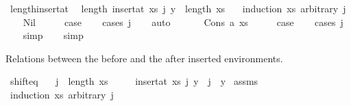 \begin{isabellebody}
\ length{\isacharunderscore}{\kern0pt}insert{\isacharunderscore}{\kern0pt}at{\isacharcolon}{\kern0pt}\isanewline
\ \ {\isachardoublequoteopen}length\ {\isacharparenleft}{\kern0pt}insert{\isacharunderscore}{\kern0pt}at\ xs\ j\ y{\isacharparenright}{\kern0pt}\ {\isacharequal}{\kern0pt}\ length\ xs\ {\isacharplus}{\kern0pt}\ {}{\isachardoublequoteclose}\isanewline
%
\isadelimproof
%
\endisadelimproof
%
\isatagproof
{}\isamarkupfalse%
\ {\isacharparenleft}{\kern0pt}induction\ xs\ arbitrary{\isacharcolon}{\kern0pt}\ j{\isacharparenright}{\kern0pt}\isanewline
\ \ \isamarkupfalse%
\ Nil\isanewline
\ \ \isamarkupfalse%
\ \isamarkupfalse%
\ {\isacharquery}{\kern0pt}case\isanewline
\ \ \isamarkupfalse%
\ {\isacharparenleft}{\kern0pt}cases\ j{\isacharparenright}{\kern0pt}\isanewline
\ \ \isamarkupfalse%
\ auto\isanewline
\ \ \isamarkupfalse%
\isanewline
{}\isamarkupfalse%
\isanewline
\ \ \isamarkupfalse%
\ {\isacharparenleft}{\kern0pt}Cons\ a\ xs{\isacharparenright}{\kern0pt}\isanewline
\ \ \isamarkupfalse%
\ \isamarkupfalse%
\ {\isacharquery}{\kern0pt}case\isanewline
\ \ \isamarkupfalse%
\ {\isacharparenleft}{\kern0pt}cases\ j{\isacharparenright}{\kern0pt}\isanewline
\ \ \isamarkupfalse%
\ simp\isanewline
\ \ \isamarkupfalse%
\ simp\isanewline
{}\isamarkupfalse%
%
\endisatagproof
{\isafoldproof}%
%
\isadelimproof
%
\endisadelimproof
%
\begin{isamarkuptext}%
Relations between the before and the after inserted environments.%
\end{isamarkuptext}\isamarkuptrue%
\isamarkupfalse%
\ shift{\isacharunderscore}{\kern0pt}eq{\isacharcolon}{\kern0pt}\isanewline
\ \ \ {\isachardoublequoteopen}j\ {\isasymle}\ length\ xs{\isachardoublequoteclose}\isanewline
\ \ \ \ \ {\isachardoublequoteopen}{\isacharparenleft}{\kern0pt}insert{\isacharunderscore}{\kern0pt}at\ xs\ j\ y{\isacharparenright}{\kern0pt}\ {\isacharbang}{\kern0pt}\ j\ {\isacharequal}{\kern0pt}\ y{\isachardoublequoteclose}\isanewline
%
\isadelimproof
%
\endisadelimproof
%
\isatagproof
{}\isamarkupfalse%
\ assms\isanewline
{}\isamarkupfalse%
\ {\isacharparenleft}{\kern0pt}induction\ xs\ arbitrary{\isacharcolon}{\kern0pt}\ j{\isacharparenright}{\kern0pt}\isanewline

\end{isabellebody}
